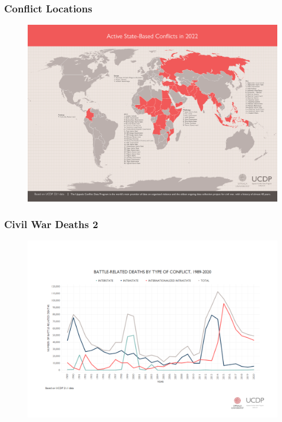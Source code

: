 \documentclass[handout]{beamer}
\begin{document}
\begin{frame} 
	\frametitle{\LARGE{Conflict Locations}}
	\begin{figure}[ht!]
		\centering
		\includegraphics[width=\textwidth,height=\textheight,keepaspectratio]{WorldWap2022SB.png}
	\end{figure}
\end{frame}

\begin{frame} 
	\frametitle{\LARGE{Civil War Deaths 2}}
	\begin{figure}[ht!]
		\centering
		\includegraphics[width=\textwidth,height=\textheight,keepaspectratio]{brd_by_toc.png}
	\end{figure}
\end{frame}
\end{document}
